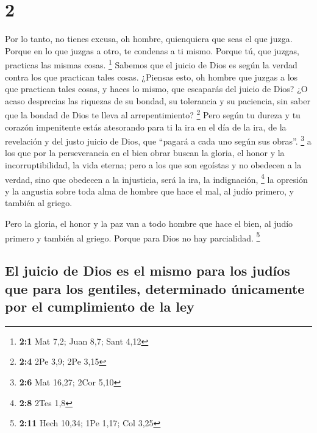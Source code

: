 \hypertarget{section-1}{%
\section{2}\label{section-1}}

 Por lo tanto, no tienes excusa, oh hombre, quienquiera
que seas el que juzga. Porque en lo que juzgas a otro, te condenas a ti
mismo. Porque tú, que juzgas, practicas las mismas cosas. \footnote{\textbf{2:1}
  Mat 7,2; Juan 8,7; Sant 4,12}  Sabemos que el juicio de
Dios es según la verdad contra los que practican tales cosas.
 ¿Piensas esto, oh hombre que juzgas a los que practican
tales cosas, y haces lo mismo, que escaparás del juicio de Dios?
 ¿O acaso desprecias las riquezas de su bondad, su
tolerancia y su paciencia, sin saber que la bondad de Dios te lleva al
arrepentimiento? \footnote{\textbf{2:4} 2Pe 3,9; 2Pe 3,15}
 Pero según tu dureza y tu corazón impenitente estás
atesorando para ti la ira en el día de la ira, de la revelación y del
justo juicio de Dios,  que ``pagará a cada uno según sus
obras''. \footnote{\textbf{2:6} Mat 16,27; 2Cor 5,10}  a
los que por la perseverancia en el bien obrar buscan la gloria, el honor
y la incorruptibilidad, la vida eterna;  pero a los que
son egoístas y no obedecen a la verdad, sino que obedecen a la
injusticia, será la ira, la indignación, \footnote{\textbf{2:8} 2Tes 1,8}
 la opresión y la angustia sobre toda alma de hombre que
hace el mal, al judío primero, y también al griego.

 Pero la gloria, el honor y la paz van a todo hombre que
hace el bien, al judío primero y también al griego. 
Porque para Dios no hay parcialidad. \footnote{\textbf{2:11} Hech 10,34;
  1Pe 1,17; Col 3,25}

\hypertarget{el-juicio-de-dios-es-el-mismo-para-los-juduxedos-que-para-los-gentiles-determinado-uxfanicamente-por-el-cumplimiento-de-la-ley}{%
\subsection{El juicio de Dios es el mismo para los judíos que para los
gentiles, determinado únicamente por el cumplimiento de la
ley}\label{el-juicio-de-dios-es-el-mismo-para-los-juduxedos-que-para-los-gentiles-determinado-uxfanicamente-por-el-cumplimiento-de-la-ley}}

